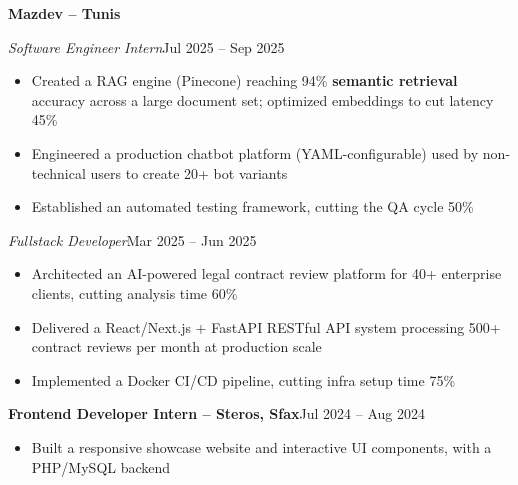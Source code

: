 \documentclass[10pt,a4paper]{article}
\newcommand{\entry}[2]{\vspace{1pt}\noindent\textbf{#1}\hfill{\color{muted}#2}\par}
\newcommand{\subentry}[2]{\noindent\textit{#1}\hfill{\color{muted}#2}\par}
\begin{document}
\entry{Mazdev -- Tunis}{}
\subentry{Software Engineer Intern}{Jul 2025 -- Sep 2025}
\begin{itemize}
  \item Created a RAG engine (Pinecone) reaching 94\% \textbf{semantic retrieval} accuracy across a large document set; optimized embeddings to cut latency 45\%
  \item Engineered a production chatbot platform (YAML-configurable) used by non-technical users to create 20+ bot variants
  \item Established an automated testing framework, cutting the QA cycle 50\%
\end{itemize}
\subentry{Fullstack Developer}{Mar 2025 -- Jun 2025}
\begin{itemize}
  \item Architected an AI-powered legal contract review platform for 40+ enterprise clients, cutting analysis time 60\%
  \item Delivered a React/Next.js + FastAPI RESTful API system processing 500+ contract reviews per month at production scale
  \item Implemented a Docker CI/CD pipeline, cutting infra setup time 75\%
\end{itemize}

\entry{Frontend Developer Intern -- Steros, Sfax}{Jul 2024 -- Aug 2024}
\begin{itemize}
  \item Built a responsive showcase website and interactive UI components, with a PHP/MySQL backend
\end{itemize}
\end{document}
